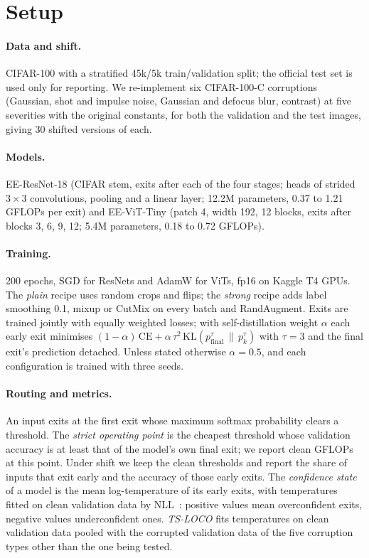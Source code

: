 \documentclass[10pt]{article}
\begin{document}
\section{Setup}
\paragraph{Data and shift.} CIFAR-100 with a stratified 45k/5k train/validation split; the official test set is used
only for reporting. We re-implement six CIFAR-100-C corruptions~\citep{hendrycks2019benchmarking} (Gaussian, shot and
impulse noise, Gaussian and defocus blur, contrast) at five severities with the original constants, for both the
validation and the test images, giving 30 shifted versions of each.
\paragraph{Models.} EE-ResNet-18 (CIFAR stem, exits after each of the four stages; heads of strided $3\times3$
convolutions, pooling and a linear layer; 12.2M parameters, 0.37 to 1.21 GFLOPs per exit) and EE-ViT-Tiny (patch 4,
width 192, 12 blocks, exits after blocks 3, 6, 9, 12; 5.4M parameters, 0.18 to 0.72 GFLOPs).
\paragraph{Training.} 200 epochs, SGD for ResNets and AdamW for ViTs, fp16 on Kaggle T4 GPUs. The \emph{plain}
recipe uses random crops and flips; the \emph{strong} recipe adds label smoothing 0.1, mixup or CutMix on every batch
and RandAugment. Exits are trained jointly with equally weighted losses; with self-distillation weight $\alpha$ each
early exit minimises $(1-\alpha)\,\mathrm{CE}+\alpha\,\tau^2\,\mathrm{KL}(p_{\text{final}}^{\tau}\,\|\,p_k^{\tau})$
with $\tau=3$ and the final exit's prediction detached. Unless stated otherwise $\alpha=0.5$, and each configuration
is trained with three seeds.
\paragraph{Routing and metrics.} An input exits at the first exit whose maximum softmax probability clears a
threshold. The \emph{strict operating point} is the cheapest threshold whose validation accuracy is at least that of
the model's own final exit; we report clean GFLOPs at this point. Under shift we keep the clean thresholds and report
the share of inputs that exit early and the accuracy of those early exits. The \emph{confidence state} of a model is
the mean log-temperature of its early exits, with temperatures fitted on clean validation data by
NLL~\citep{guo2017calibration}: positive values mean overconfident exits, negative values underconfident ones.
\emph{TS-LOCO} fits temperatures on clean validation data pooled with the corrupted validation data of the five
corruption types other than the one being tested.
\end{document}
